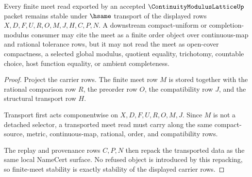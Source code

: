 \begin{theorem}
\label{thm:continuity-modulus-lattice-finite-meet-stability}
Every finite meet read exported by an accepted $\ContinuityModulusLatticeUp$ packet remains stable under $\hsame$ transport of the displayed rows $X,D,F,U,R,O,M,J,H,C,P,N$. A downstream compact-uniform or completion-modulus consumer may cite the meet as a finite order object over continuous-map and rational tolerance rows, but it may not read the meet as open-cover compactness, a selected global modulus, quotient equality, trichotomy, countable choice, host function equality, or ambient completeness.
\end{theorem}
\begin{proof}
Project the carrier rows. The finite meet row $M$ is stored together with the rational comparison row $R$, the preorder row $O$, the compatibility row $J$, and the structural transport row $H$.

Transport first acts componentwise on $X,D,F,U,R,O,M,J$. Since $M$ is not a detached selector, a transported meet read must carry along the same compact-source, metric, continuous-map, rational, order, and compatibility rows.

The replay and provenance rows $C,P,N$ then repack the transported data as the same local NameCert surface. No refused object is introduced by this repacking, so finite-meet stability is exactly stability of the displayed carrier rows.
\end{proof}


\begin{closurestatus}{\ContinuityModulusLatticeUp}
  \theoryclosure{\seedClosure}
  \formalstatus{\unformalizedV}
\end{closurestatus}
